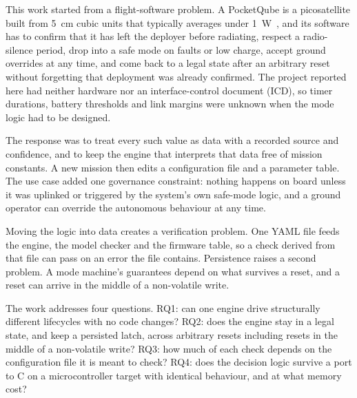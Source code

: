 \documentclass[preprint,12pt]{elsarticle}
\begin{document}
This work started from a flight-software problem. A PocketQube is a picosatellite built from 5~cm cubic units that typically averages under 1~W~\cite{Franzese2025Survey}, and its software has to confirm that it has left the deployer before radiating, respect a radio-silence period, drop into a safe mode on faults or low charge, accept ground overrides at any time, and come back to a legal state after an arbitrary reset without forgetting that deployment was already confirmed. The project reported here had neither hardware nor an interface-control document (ICD), so timer durations, battery thresholds and link margins were unknown when the mode logic had to be designed.

The response was to treat every such value as data with a recorded source and confidence, and to keep the engine that interprets that data free of mission constants. A new mission then edits a configuration file and a parameter table. The use case added one governance constraint: nothing happens on board unless it was uplinked or triggered by the system's own safe-mode logic, and a ground operator can override the autonomous behaviour at any time.

Moving the logic into data creates a verification problem. One YAML file feeds the engine, the model checker and the firmware table, so a check derived from that file can pass on an error the file contains. Persistence raises a second problem. A mode machine's guarantees depend on what survives a reset, and a reset can arrive in the middle of a non-volatile write.

The work addresses four questions. RQ1: can one engine drive structurally different lifecycles with no code changes? RQ2: does the engine stay in a legal state, and keep a persisted latch, across arbitrary resets including resets in the middle of a non-volatile write? RQ3: how much of each check depends on the configuration file it is meant to check? RQ4: does the decision logic survive a port to C on a microcontroller target with identical behaviour, and at what memory cost?
\end{document}
